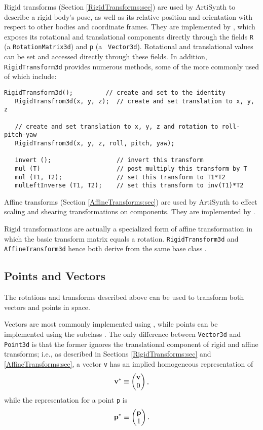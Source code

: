 Rigid transforms (Section \ref{RigidTransforms:sec}) are used by
ArtiSynth to describe a rigid body's pose, as well as its relative
position and orientation with respect to other bodies and coordinate
frames.  They are implemented by
, which exposes its
rotational and translational components directly through the fields
{\tt R} (a {\tt RotationMatrix3d}) and {\tt p} (a {\tt
Vector3d}). Rotational and translational values can be set and
accessed directly through these fields.  In addition, {\tt
RigidTransform3d} provides numerous methods, some of the more commonly
used of which include:
%
\begin{lstlisting}[]
   RigidTransform3d();         // create and set to the identity
   RigidTransfrom3d(x, y, z);  // create and set translation to x, y, z

   // create and set translation to x, y, z and rotation to roll-pitch-yaw
   RigidTransfrom3d(x, y, z, roll, pitch, yaw);

   invert ();                  // invert this transform
   mul (T)                     // post multiply this transform by T
   mul (T1, T2);               // set this transform to T1*T2
   mulLeftInverse (T1, T2);    // set this transform to inv(T1)*T2
\end{lstlisting}
%

Affine transforms (Section \ref{AffineTransforms:sec}) are used by
ArtiSynth to effect scaling and shearing transformations on
components. They are implemented by
.

Rigid transformations are actually a specialized form of affine
transformation in which the basic transform matrix equals a rotation.
{\tt RigidTransform3d} and {\tt AffineTransform3d} hence both derive
from the same base class
.

\subsection{Points and Vectors}

The rotations and transforms described above can be used to transform
both vectors and points in space.

Vectors are most commonly implemented using
, while points can be implemented
using the subclass .  The only
difference between {\tt Vector3d} and {\tt Point3d} is that the former
ignores the translational component of rigid and affine transforms;
i.e., as described in Sections \ref{RigidTransforms:sec} and
\ref{AffineTransforms:sec}, a vector {\tt v} has
an implied homogeneous representation of
%
\begin{equation}
{\bf v}^* \equiv \left(\begin{matrix} {\bf v} \\ 0 \end{matrix}\right),
\end{equation}
%
while the representation for a point {\tt p} is
%
\begin{equation}
{\bf p}^* \equiv \left(\begin{matrix} {\bf p} \\ 1 \end{matrix}\right).
\end{equation}
%

